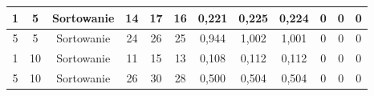 \documentclass[magisterska]{pracamgr}
\begin{document}
\begin{table}[H]
{\begin{tabular}{cccccccccccc}
1                                                              & 5                                                      & Sortowanie & 14                                                     & 17                                                     & 16                                                        & 0,221                                                     & 0,225                                                     & 0,224                                                         & 0                                                                 & 0                                                                  & 0                                                                    \\ \hline
5                                                              & 5                                                      & Sortowanie & 24                                                     & 26                                                     & 25                                                        & 0,944                                                     & 1,002                                                     & 1,001                                                         & 0                                                                 & 0                                                                  & 0                                                                    \\ \hline
1                                                              & 10                                                     & Sortowanie & 11                                                     & 15                                                     & 13                                                        & 0,108                                                     & 0,112                                                     & 0,112                                                         & 0                                                                 & 0                                                                  & 0                                                                    \\ \hline
5                                                              & 10                                                     & Sortowanie & 26                                                     & 30                                                     & 28                                                        & 0,500                                                     & 0,504                                                     & 0,504                                                         & 0                                                                 & 0                                                                  & 0                                                                    \\ \hline
\end{tabular}%
}
\end{table}
\end{document}
